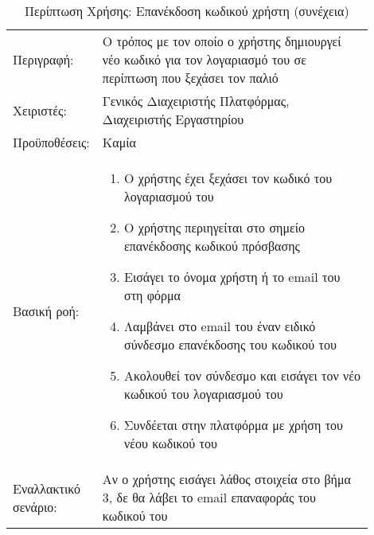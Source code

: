 %
%
\begin{longtable}{|p{0.14\linewidth}|p{0.76\linewidth}|}
	\caption{Περίπτωση Χρήσης: Επανέκδοση κωδικού χρήστη} \label{tab:use-case-forgot-password} \\ \hline \endfirsthead
	\caption[{}]{Περίπτωση Χρήσης: Επανέκδοση κωδικού χρήστη (συνέχεια)} \\ \endhead \endfoot
	Περιγραφή: & Ο τρόπος με τον οποίο ο χρήστης δημιουργεί νέο κωδικό για τον λογαριασμό του σε περίπτωση που ξεχάσει τον παλιό \\ \hline
	Χειριστές: & Γενικός Διαχειριστής Πλατφόρμας, Διαχειριστής Εργαστηρίου \\ \hline
	Προϋποθέσεις: & Καμία \\ \hline
	Βασική ροή: &
	\begin{enumerate}
		\vspace{-1cm}
		\addtolength{\itemindent}{-0.4cm}
		\item Ο χρήστης έχει ξεχάσει τον κωδικό του λογαριασμού του
		\item Ο χρήστης περιηγείται στο σημείο επανέκδοσης κωδικού πρόσβασης
		\item Εισάγει το όνομα χρήστη ή το email του στη φόρμα
		\item Λαμβάνει στο email του έναν ειδικό σύνδεσμο επανέκδοσης του κωδικού του
		\item Ακολουθεί τον σύνδεσμο και εισάγει τον νέο κωδικού του λογαριασμού του
		\item Συνδέεται στην πλατφόρμα με χρήση του νέου κωδικού του
		\vspace{-0.7cm}
	\end{enumerate} \\ \hline
	Εναλλακτικό σενάριο: & Αν ο χρήστης εισάγει λάθος στοιχεία στο βήμα 3, δε θα λάβει το email επαναφοράς του κωδικού του \\ \hline
\end{longtable}

